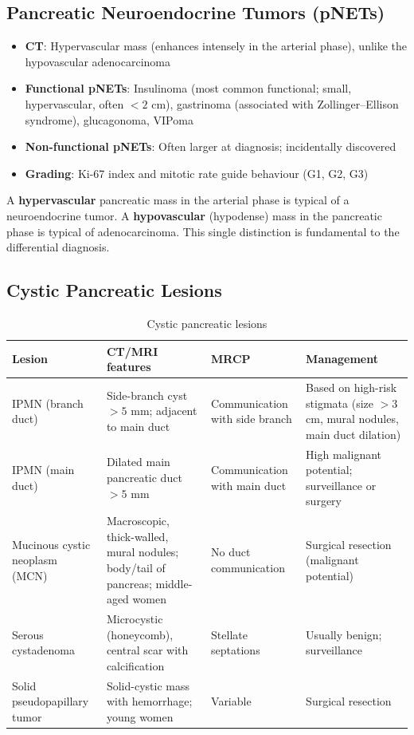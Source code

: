 \subsection{Pancreatic Neuroendocrine Tumors (pNETs)}
\begin{itemize}
  \item \textbf{CT}: Hypervascular mass (enhances intensely in the arterial phase), unlike the hypovascular adenocarcinoma
  \item \textbf{Functional pNETs}: Insulinoma (most common functional; small, hypervascular, often $< 2$ cm), gastrinoma (associated with Zollinger--Ellison syndrome), glucagonoma, VIPoma
  \item \textbf{Non-functional pNETs}: Often larger at diagnosis; incidentally discovered
  \item \textbf{Grading}: Ki-67 index and mitotic rate guide behaviour (G1, G2, G3)
\end{itemize}

\begin{pearlbox}
A \textbf{hypervascular} pancreatic mass in the arterial phase is typical of a neuroendocrine tumor. A \textbf{hypovascular} (hypodense) mass in the pancreatic phase is typical of adenocarcinoma. This single distinction is fundamental to the differential diagnosis.
\end{pearlbox}

\subsection{Cystic Pancreatic Lesions}

\begin{table}[h]
\centering
\caption{Cystic pancreatic lesions}
\begin{tabular}{p{2.5cm} p{3cm} p{3.5cm} p{3cm}}
\hline
\textbf{Lesion} & \textbf{CT/MRI features} & \textbf{MRCP} & \textbf{Management} \\
\hline
IPMN (branch duct) & Side-branch cyst $> 5$ mm; adjacent to main duct & Communication with side branch & Based on high-risk stigmata (size $> 3$ cm, mural nodules, main duct dilation) \\
IPMN (main duct) & Dilated main pancreatic duct $> 5$ mm & Communication with main duct & High malignant potential; surveillance or surgery \\
Mucinous cystic neoplasm (MCN) & Macroscopic, thick-walled, mural nodules; body/tail of pancreas; middle-aged women & No duct communication & Surgical resection (malignant potential) \\
Serous cystadenoma & Microcystic (honeycomb), central scar with calcification & Stellate septations & Usually benign; surveillance \\
Solid pseudopapillary tumor & Solid-cystic mass with hemorrhage; young women & Variable & Surgical resection \\
\hline
\end{tabular}
\end{table}

